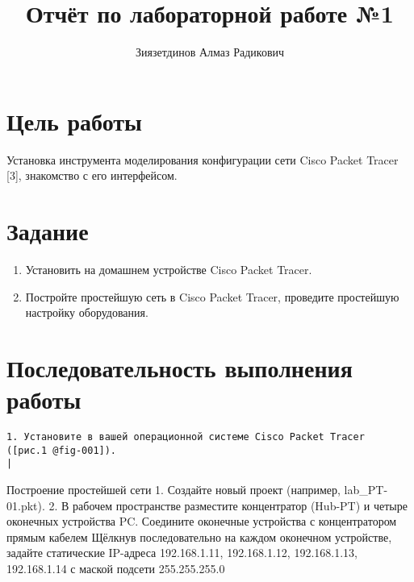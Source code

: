 \documentclass[
  english,
  russian,
  12pt,
  a4paper,
  DIV=11,
  numbers=noendperiod]{scrreprt}
\title{Отчёт по лабораторной работе №1}
\author{Зиязетдинов Алмаз Радикович}
\date{}
\providecommand{\tightlist}{%
  \setlength{\itemsep}{0pt}\setlength{\parskip}{0pt}}
\renewcommand*\contentsname{Содержание}
\newcommand\contentsname{Содержание}
\begin{document}
\maketitle

\renewcommand*\contentsname{Содержание}
{
\setcounter{tocdepth}{1}
\tableofcontents
}
\listoffigures
\listoftables

\chapter{Цель
работы}\label{ux446ux435ux43bux44c-ux440ux430ux431ux43eux442ux44b}

Установка инструмента моделирования конфигурации сети Cisco Packet
Tracer {[}3{]}, знакомство с его интерфейсом.

\chapter{Задание}\label{ux437ux430ux434ux430ux43dux438ux435}

\begin{enumerate}
\def\labelenumi{\arabic{enumi}.}
\tightlist
\item
  Установить на домашнем устройстве Cisco Packet Tracer.
\item
  Постройте простейшую сеть в Cisco Packet Tracer, проведите простейшую
  настройку оборудования.
\end{enumerate}

\chapter{Последовательность выполнения
работы}\label{ux43fux43eux441ux43bux435ux434ux43eux432ux430ux442ux435ux43bux44cux43dux43eux441ux442ux44c-ux432ux44bux43fux43eux43bux43dux435ux43dux438ux44f-ux440ux430ux431ux43eux442ux44b}

\begin{verbatim}
1. Установите в вашей операционной системе Cisco Packet Tracer     ([рис.1 @fig-001]).                                                                 |
\end{verbatim}

Построение простейшей сети 1. Создайте новый проект (например,
lab\_PT-01.pkt). 2. В рабочем пространстве разместите концентратор
(Hub-PT) и четыре оконечных устройства PC. Соедините оконечные
устройства с концентратором прямым кабелем Щёлкнув последовательно на
каждом оконечном устройстве, задайте статические IP-адреса 192.168.1.11,
192.168.1.12, 192.168.1.13, 192.168.1.14 с маской подсети 255.255.255.0
\end{document}
